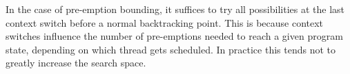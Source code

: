 In the case of pre-emption bounding, it suffices to try all possibilities at the
last context switch before a normal backtracking point.  This is because context
switches influence the number of pre-emptions needed to reach a given program
state, depending on which thread gets scheduled.  In practice this tends not to
greatly increase the search space.

